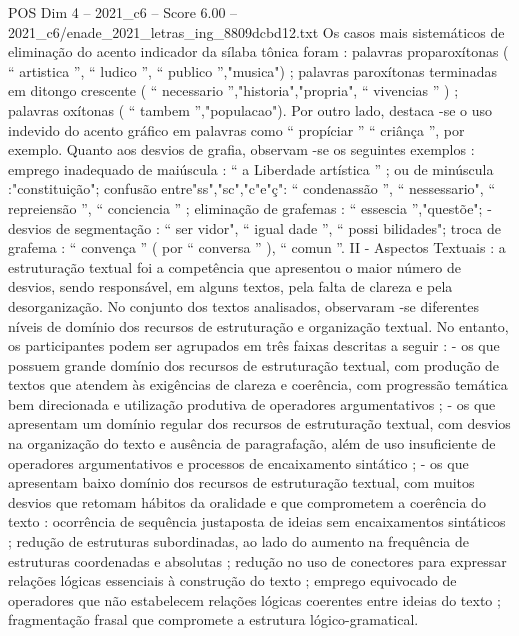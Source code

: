 \begin{textsample}{POS Dim 4 – 2021\_c6 – Score 6.00 – 2021\_c6/enade\_2021\_letras\_ing\_8809dcbd12.txt}
Os casos mais sistemáticos de eliminação do acento indicador da sílaba tônica foram : palavras proparoxítonas ( “ artistica ”, “ ludico ”, “ publico ”,"musica") ; palavras paroxítonas terminadas em ditongo crescente ( “ necessario ”,"historia","propria", “ vivencias ” ) ; palavras oxítonas ( “ tambem ”,"populacao").
Por outro lado, destaca -se o uso indevido do acento gráfico em palavras como “ propíciar ” “ criânça ”, por exemplo.
Quanto aos desvios de grafia, observam -se os seguintes exemplos : emprego inadequado de maiúscula : “ a Liberdade artística ” ; ou de minúscula :"constituição"; confusão entre"ss","sc","c"e"ç": “ condenassão ”, “ nessessario", “ repreiensão ”, “ conciencia ” ; eliminação de grafemas : “ essescia ”,"questõe"; - desvios de segmentação : “ ser vidor", “ igual dade ”, “ possi bilidades"; troca de grafema : “ convença ” ( por “ conversa ” ), “ comun ”.
II - Aspectos Textuais : a estruturação textual foi a competência que apresentou o maior número de desvios, sendo responsável, em alguns textos, pela falta de clareza e pela desorganização.
No conjunto dos textos analisados, observaram -se diferentes níveis de domínio dos recursos de estruturação e organização textual.
No entanto, os participantes podem ser agrupados em três faixas descritas a seguir : - os que possuem grande domínio dos recursos de estruturação textual, com produção de textos que atendem às exigências de clareza e coerência, com progressão temática bem direcionada e utilização produtiva de operadores argumentativos ; - os que apresentam um domínio regular dos recursos de estruturação textual, com desvios na organização do texto e ausência de paragrafação, além de uso insuficiente de operadores argumentativos e processos de encaixamento sintático ; - os que apresentam baixo domínio dos recursos de estruturação textual, com muitos desvios que retomam hábitos da oralidade e que comprometem a coerência do texto : ocorrência de sequência justaposta de ideias sem encaixamentos sintáticos ; redução de estruturas subordinadas, ao lado do aumento na frequência de estruturas coordenadas e absolutas ; redução no uso de conectores para expressar relações lógicas essenciais à construção do texto ; emprego equivocado de operadores que não estabelecem relações lógicas coerentes entre ideias do texto ; fragmentação frasal que compromete a estrutura lógico-gramatical.

\end{textsample}
